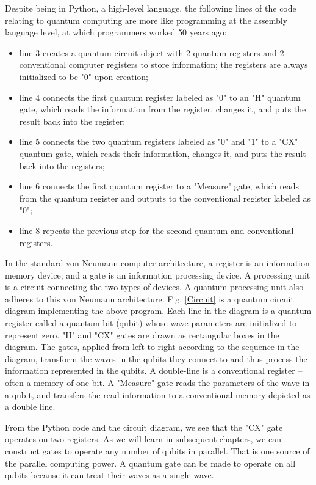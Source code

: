 \documentclass[oneside, letter, 12pt]{book}
\begin{document}
Despite being in Python, a high-level language, the following lines of the code relating to quantum computing are more like programming at the assembly language level, at which programmers worked 50 years ago:
\begin{itemize}
\item line 3 creates a quantum circuit object with 2 quantum registers and 2 conventional computer registers to store information; the registers are always initialized to be "0" upon creation;
\item line 4 connects the first quantum register labeled as "0" to an "H" quantum gate, which reads the information from the register, changes it, and puts the result back into the register;
\item line 5 connects the two quantum registers labeled as "0" and "1" to a "CX" quantum gate, which reads their information, changes it, and puts the result back into the registers;
\item line 6 connects the first quantum register to a "Measure" gate, which reads from the quantum register and outputs to the conventional register labeled as "0";
\item line 8 repeats the previous step for the second quantum and conventional registers.
\end{itemize}

In the standard von Neumann computer architecture, a register is an information memory device; and a gate is an information processing device. A processing unit is a circuit connecting the two types of devices. A quantum processing unit also adheres to this von Neumann architecture. Fig. \ref{Circuit} is a quantum circuit diagram implementing the above program. Each line in the diagram is a quantum register called a quantum bit (qubit) whose wave parameters are initialized to represent zero. "H" and "CX" gates are drawn as rectangular boxes in the diagram. The gates, applied from left to right according to the sequence in the diagram, transform the waves in the qubits they connect to and thus process the information represented in the qubits. A double-line is a conventional register -- often a memory of one bit. A "Measure" gate reads the parameters of the wave in a qubit, and transfers the read information to a conventional memory depicted as a double line.

From the Python code and the circuit diagram, we see that the "CX" gate operates on two registers. As we will learn in subsequent chapters, we can construct gates to operate any number of qubits in parallel. That is one source of the parallel computing power. A quantum gate can be made to operate on all qubits because it can treat their waves as a single wave.
\end{document}
